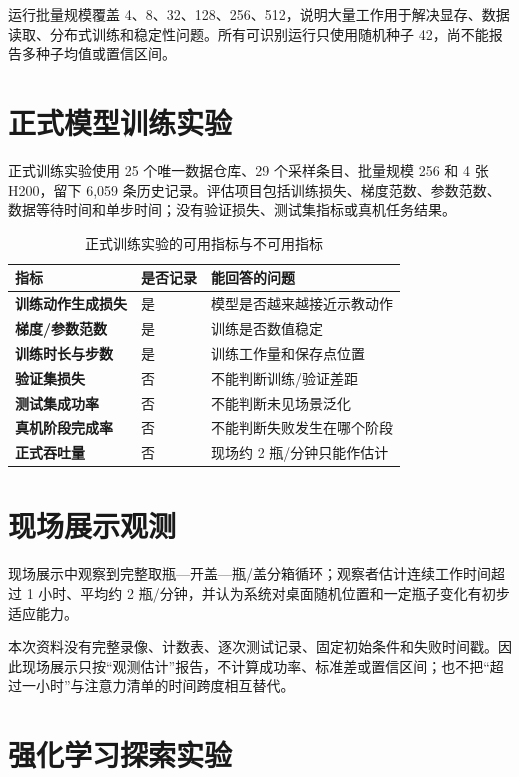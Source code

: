 运行批量规模覆盖 4、8、32、128、256、512，说明大量工作用于解决显存、数据读取、分布式训练和稳定性问题。所有可识别运行只使用随机种子 42，尚不能报告多种子均值或置信区间。

\section{正式模型训练实验}

正式训练实验使用 25 个唯一数据仓库、29 个采样条目、批量规模 256 和 4 张 H200，留下 6,059 条历史记录。评估项目包括训练损失、梯度范数、参数范数、数据等待时间和单步时间；没有验证损失、测试集指标或真机任务结果。

\begin{table}[H]
\centering
\caption{正式训练实验的可用指标与不可用指标}
\begin{tabularx}{\textwidth}{>{\bfseries}p{38mm}p{24mm}X}
\toprule
指标 & 是否记录 & 能回答的问题\\
\midrule
训练动作生成损失 & 是 & 模型是否越来越接近示教动作\\
梯度/参数范数 & 是 & 训练是否数值稳定\\
训练时长与步数 & 是 & 训练工作量和保存点位置\\
验证集损失 & 否 & 不能判断训练/验证差距\\
测试集成功率 & 否 & 不能判断未见场景泛化\\
真机阶段完成率 & 否 & 不能判断失败发生在哪个阶段\\
正式吞吐量 & 否 & 现场约 2 瓶/分钟只能作估计\\
\bottomrule
\end{tabularx}
\end{table}

\section{现场展示观测}

现场展示中观察到完整取瓶—开盖—瓶/盖分箱循环；观察者估计连续工作时间超过 1 小时、平均约 2 瓶/分钟，并认为系统对桌面随机位置和一定瓶子变化有初步适应能力。

本次资料没有完整录像、计数表、逐次测试记录、固定初始条件和失败时间戳。因此现场展示只按“观测估计”报告，不计算成功率、标准差或置信区间；也不把“超过一小时”与注意力清单的时间跨度相互替代。

\section{强化学习探索实验}

